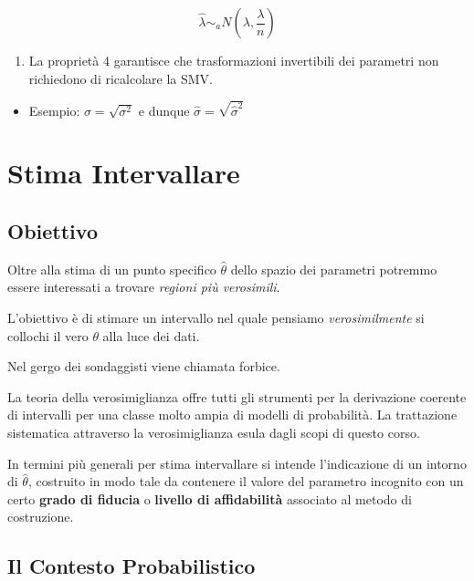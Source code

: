 \documentclass[
  11pt,
]{book}
\providecommand{\tightlist}{%
  \setlength{\itemsep}{0pt}\setlength{\parskip}{0pt}}
\theoremstyle{mytheoremstyle}
\theoremstyle{mydefstyle}
\begin{document}
\[
  \hat\lambda\mathop{\sim}_a N\left(\lambda,\frac{\lambda}{n}\right)
  \]

\begin{enumerate}
\def\labelenumi{\arabic{enumi}.}
\setcounter{enumi}{3}
\tightlist
\item
  La proprietà 4 garantisce che trasformazioni invertibili dei parametri non
  richiedono di ricalcolare la SMV.
\end{enumerate}

\begin{itemize}
\tightlist
\item
  Esempio: \(\sigma=\sqrt{\sigma^2}\) e dunque \(\hat\sigma=\sqrt{\hat\sigma^2}\)
\end{itemize}

\chapter{Stima Intervallare}\label{stima-intervallare}

\section{Obiettivo}\label{obiettivo-2}

Oltre alla stima di un punto specifico \(\hat\theta\) dello spazio dei parametri potremmo essere interessati a trovare \emph{regioni più verosimili}.

L'obiettivo è di stimare un intervallo nel quale pensiamo \emph{verosimilmente} si collochi il vero \(\theta\) alla luce dei dati.

Nel gergo dei sondaggisti viene chiamata forbice.

La teoria della verosimiglianza offre tutti gli strumenti per la derivazione coerente di intervalli per una classe molto ampia di modelli di probabilità. La trattazione sistematica attraverso la verosimiglianza esula dagli scopi di questo corso.

In termini più generali per stima intervallare si intende l'indicazione di un intorno di \(\hat\theta\), costruito in modo tale da contenere il valore del parametro incognito con un certo \textbf{grado di fiducia} o \textbf{livello di affidabilità} associato al metodo di costruzione.

\section{Il Contesto Probabilistico}\label{il-contesto-probabilistico}
\end{document}
